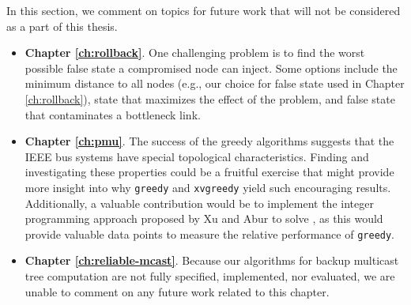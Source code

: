 In this section, we comment on topics for future work that will not be considered as a part of this thesis.  
\begin{itemize}
	\item {\bf Chapter \ref{ch:rollback}}. 
	One challenging problem is to find the worst possible false state a compromised node can inject.  Some options include the minimum distance to all nodes (e.g., 
our choice for false state used in Chapter \ref{ch:rollback}), state that maximizes the effect of the \infinity problem, and false state that contaminates a bottleneck link. 

	\item {\bf Chapter \ref{ch:pmu}}. 
The success of the greedy algorithms suggests that the IEEE bus systems have special topological characteristics.  Finding and investigating these properties could be a fruitful 
exercise that might provide more insight into why {\tt greedy} and {\tt xvgreedy} yield such encouraging results.
Additionally, a valuable contribution would be to implement the integer programming approach proposed by Xu and Abur \cite{Xu04} to solve \fulls, as this would
provide valuable data points to measure the relative performance of {\tt greedy}.
	
	\item {\bf Chapter \ref{ch:reliable-mcast}}. Because our algorithms for backup multicast tree computation are not fully specified, implemented, nor evaluated, we are unable to comment
	on any future work related to this chapter.
	
\end{itemize}







